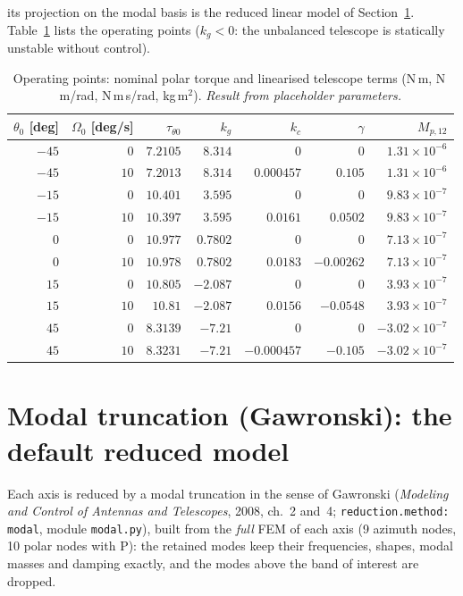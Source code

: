 \documentclass[10pt,a4paper]{article}
\numberwithin{equation}{section}
\begin{document}
its projection on the modal basis is the reduced linear model of Section~\ref{sec:modal}. Table~\ref{tab:op} lists the operating points ($k_g < 0$: the unbalanced telescope is statically unstable without control).
\begin{table}[H]\centering\small
\caption{Operating points: nominal polar torque and linearised telescope terms (N\,m, N\,m/rad, N\,m\,s/rad, kg\,m$^2$). \emph{Result from placeholder parameters.}}\label{tab:op}
\begin{tabular}{rrrrrrr}\toprule
$\theta_0$ [deg] & $\Omega_0$ [deg/s] & $\tau_{\theta0}$ & $k_g$ & $k_c$ & $\gamma$ & $M_{p,12}$ \\ \midrule
$-45$ & $0$ & $7.2105$ & $8.314$ & $0$ & $0$ & $1.31\times10^{-6}$ \\
$-45$ & $10$ & $7.2013$ & $8.314$ & $0.000457$ & $0.105$ & $1.31\times10^{-6}$ \\
$-15$ & $0$ & $10.401$ & $3.595$ & $0$ & $0$ & $9.83\times10^{-7}$ \\
$-15$ & $10$ & $10.397$ & $3.595$ & $0.0161$ & $0.0502$ & $9.83\times10^{-7}$ \\
$0$ & $0$ & $10.977$ & $0.7802$ & $0$ & $0$ & $7.13\times10^{-7}$ \\
$0$ & $10$ & $10.978$ & $0.7802$ & $0.0183$ & $-0.00262$ & $7.13\times10^{-7}$ \\
$15$ & $0$ & $10.805$ & $-2.087$ & $0$ & $0$ & $3.93\times10^{-7}$ \\
$15$ & $10$ & $10.81$ & $-2.087$ & $0.0156$ & $-0.0548$ & $3.93\times10^{-7}$ \\
$45$ & $0$ & $8.3139$ & $-7.21$ & $0$ & $0$ & $-3.02\times10^{-7}$ \\
$45$ & $10$ & $8.3231$ & $-7.21$ & $-0.000457$ & $-0.105$ & $-3.02\times10^{-7}$ \\
\bottomrule\end{tabular}\end{table}
\section{Modal truncation (Gawronski): the default reduced model}\label{sec:modal}
Each axis is reduced by a modal truncation in the sense of Gawronski (\emph{Modeling and Control of Antennas and Telescopes}, 2008, ch.~2 and~4; \texttt{reduction.method: modal}, module \texttt{modal.py}), built from the \emph{full} FEM of each axis (9 azimuth nodes, 10 polar nodes with P): the retained modes keep their frequencies, shapes, modal masses and damping exactly, and the modes above the band of interest are dropped.
\end{document}
